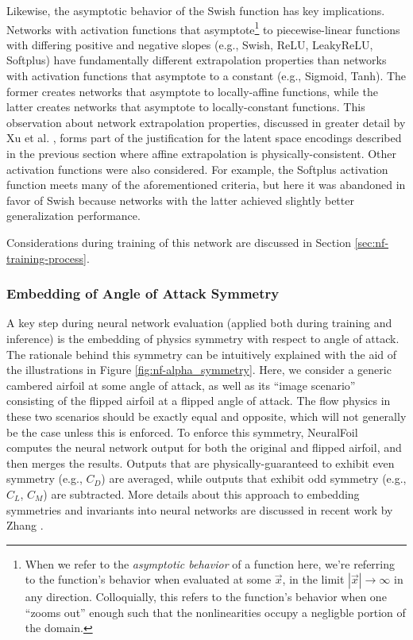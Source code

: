 Likewise, the asymptotic behavior of the Swish function has key implications. Networks with activation functions that asymptote\footnote{When we refer to the \emph{asymptotic behavior} of a function here, we're referring to the function's behavior when evaluated at some $\vec{x}$, in the limit $|\vec{x}|\rightarrow \infty$ in any direction. Colloquially, this refers to the function's behavior when one ``zooms out'' enough such that the nonlinearities occupy a negligble portion of the domain.} to piecewise-linear functions with differing positive and negative slopes (e.g., Swish, ReLU, LeakyReLU, Softplus) have fundamentally different extrapolation properties than networks with activation functions that asymptote to a constant (e.g., Sigmoid, Tanh). The former creates networks that asymptote to locally-affine functions, while the latter creates networks that asymptote to locally-constant functions. This observation about network extrapolation properties, discussed in greater detail by Xu et al. \cite{xu_how_2021}, forms part of the justification for the latent space encodings described in the previous section where affine extrapolation is physically-consistent. Other activation functions were also considered. For example, the Softplus activation function meets many of the aforementioned criteria, but here it was abandoned in favor of Swish because networks with the latter achieved slightly better generalization performance.

Considerations during training of this network are discussed in Section \ref{sec:nf-training-process}.

\subsubsection{Embedding of Angle of Attack Symmetry}

A key step during neural network evaluation (applied both during training and inference) is the embedding of physics symmetry with respect to angle of attack. The rationale behind this symmetry can be intuitively explained with the aid of the illustrations in Figure \ref{fig:nf-alpha_symmetry}. Here, we consider a generic cambered airfoil at some angle of attack, as well as its ``image scenario'' consisting of the flipped airfoil at a flipped angle of attack. The flow physics in these two scenarios should be exactly equal and opposite, which will not generally be the case unless this is enforced. To enforce this symmetry, NeuralFoil computes the neural network output for both the original and flipped airfoil, and then merges the results. Outputs that are physically-guaranteed to exhibit even symmetry (e.g., $C_D$) are averaged, while outputs that exhibit odd symmetry (e.g., $C_L$, $C_M$) are subtracted. More details about this approach to embedding symmetries and invariants into neural networks are discussed in recent work by Zhang \cite{zhang_threedimensional_2022}.

